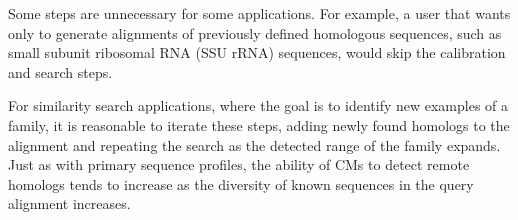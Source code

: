 Some steps are unnecessary for some applications. For example, a user
that wants only to generate alignments of previously defined
homologous sequences, such as small subunit ribosomal RNA (SSU rRNA)
sequences, would skip the calibration and search steps.

For similarity search applications, where the goal is to identify new
examples of a family, it is reasonable to iterate these steps, adding
newly found homologs to the alignment and repeating the search as the
detected range of the family expands. Just as with primary sequence
profiles, the ability of CMs to detect remote homologs tends to
increase as the diversity of known sequences in the query alignment
increases.

